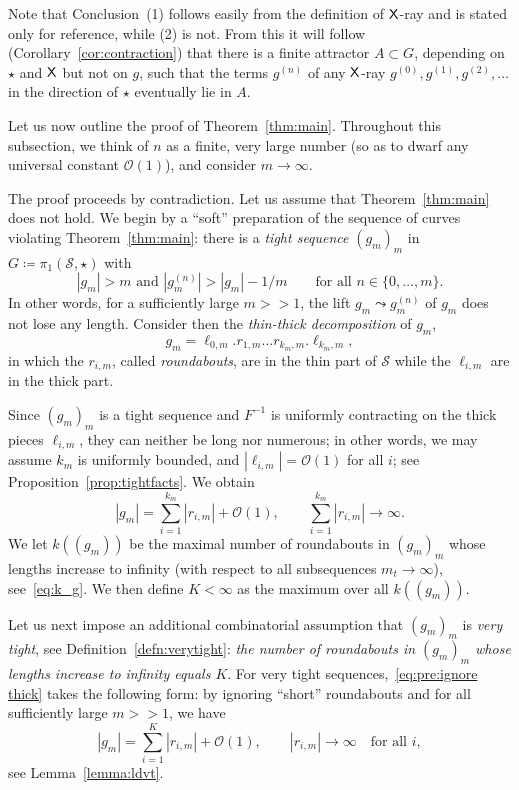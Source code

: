 \documentclass{amsart}
\theoremstyle{definition}
\theoremstyle{remark}
\newcommand{\sfX}{{\sf X}}
\newcommand{\cS}{\mathcal{S}}
\renewcommand\gg{>\!\!>}
\begin{document}
Note that Conclusion~(1) follows easily from the definition of $\sfX$-ray and is stated only for reference, while (2) is not.  From this it will follow (Corollary~\ref{cor:contraction}) that there is a finite attractor $A\subset G$, depending on $\star$ and $\sfX$ but not on $g$, such that the terms $g^{(n)}$ of any $\sfX$-ray $g^{(0)}, g^{(1)}, g^{(2)}, \ldots$ in the direction of $\star$ eventually lie in $A$. 

Let us now outline the proof of Theorem~\ref{thm:main}. Throughout this subsection, we think of $n$ as a finite, very large number (so as to dwarf any universal constant $\mathcal O(1)$), and consider $m\to\infty$.

The proof proceeds by contradiction. Let us assume that Theorem~\ref{thm:main} does not hold. We begin by a ``soft'' preparation of the sequence of curves violating Theorem~\ref{thm:main}: there is a \emph{tight sequence} $(g_m)_m$ in $G\coloneqq  \pi_1(\cS, \star)$ with
\begin{equation}
\label{ed:dfn:tight}
 |g_m|>m\text{ and }|g_m^{(n)}|>|g_m|-1/m\qquad\text{for all }n\in\{0,\dots,m\}.
\end{equation}
In other words, for a sufficiently large $m\gg 1$, the lift $g_m \leadsto g^{(n)}_{m}$ of $g_m$ does not lose any length. Consider then the \emph{thin-thick decomposition} of $g_m$,
\begin{equation}\label{eq:g_m:decomp}
 g_m = \ell_{0,m}.r_{1,m}\ldots r_{k_m,m}. \ell_{k_m,m},
\end{equation}
in which the $r_{i,m}$, called \emph{roundabouts}, are in the thin part of $\cS$ while the $\ell_{i,m}$ are in the thick part. 




Since $(g_m)_m$ is a tight sequence and $F^{-1}$ is uniformly contracting on the thick pieces $\ell_{i,m}$, they can neither be long nor numerous; in other words, we may assume $k_m$ is uniformly bounded, and $|\ell_{i,m}|=\mathcal O(1)$ for all $i$; see Proposition~\ref{prop:tightfacts}. We obtain
\begin{equation}\label{eq:pre:ignore thick}
  |g_m|=\sum_{i=1}^{k_m} |r_{i,m}|+\mathcal O(1), \qquad \sum_{i=1}^{k_m}  |r_{i,m}| \to \infty.
\end{equation}
We let $k((g_m))$ be the maximal number of roundabouts in $(g_m)_m$ whose lengths increase to infinity (with respect to all subsequences $m_t\to\infty$), see~\eqref{eq:k_g}. We then define $K<\infty$ as the maximum over all $k((g_m))$. 

Let us next impose an additional combinatorial assumption that $(g_m)_m$ is \emph{very tight}, see Definition~\ref{defn:verytight}: \emph{the number of roundabouts in $(g_m)_m$ whose lengths increase to infinity equals $K$}. For very tight sequences,~\eqref{eq:pre:ignore thick} takes the following form: by ignoring ``short'' roundabouts and for all sufficiently large $m\gg 1$, we have
\begin{equation}\label{eq:ignore thick}
  |g_m|=\sum_{i=1}^{K} |r_{i,m}|+\mathcal O(1), \qquad |r_{i,m}| \to \infty\quad  \text{for all $i$},
\end{equation}
see Lemma~\ref{lemma:ldvt}.
\end{document}
